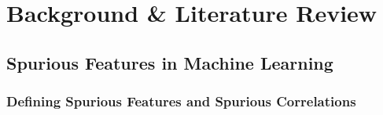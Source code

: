 \graphicspath{{content/chapters/2_background/figures/}}

\chapter{Background \& Literature Review}%
\label{chp:background&lit}


\section{Spurious Features in Machine Learning}
\label{sec:spurious_features}

\subsection*{Defining Spurious Features and Spurious Correlations}
%
